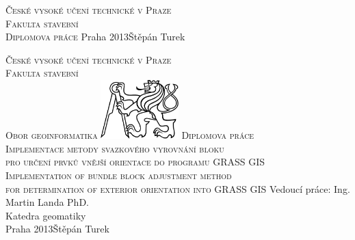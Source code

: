 \begin{center}



\newcommand{\napisCVUT}{České vysoké učení technické v Praze}
\newcommand{\napisFS}{Fakulta stavební}
\newcommand{\napisObor}{Obor geoinformatika}
\newcommand{\napisKatedra}{Katedra geomatiky}
\newcommand{\napisVedouci}{Ing. Martin Landa PhD.}
\newcommand{\napisAutor}{Štěpán Turek}
\newcommand{\napisDatum}{Praha 2013}
\newcommand{\napisNazevI}{Implementace metody svazkového vyrovnání bloku}
\newcommand{\napisNazevII}{pro určení prvků vnější orientace do programu GRASS GIS}
\newcommand{\napisNazevAjI}{Implementation of bundle block adjustment method}
\newcommand{\napisNazevAjII}{for determination of exterior orientation into GRASS GIS}
\newcommand{\napisBakalarka}{Diplomova práce}
\newcommand{\napisPraha}{Praha 2013}


%
\newcommand{\velka}[1]{\textsc{#1}}
%
% 
\newif\ifpatitul
\patitultrue

\ifpatitul
{\Large\velka{\napisCVUT}}\\
\velka{\Large\napisFS}\\
\vfill
{\LARGE\velka{\napisBakalarka}}
\vfill
{\large\napisPraha\hfill\napisAutor}
\newpage
\fi%


{\Large\velka{\napisCVUT}}\\
{\Large\velka{\napisFS}}\\
{\Large\velka{\napisObor}}
\vfill
\includegraphics[width=3cm]{logo_cvut_cb} %
\vfill
{\Large\velka{\napisBakalarka}}\\
{\Large\velka{\napisNazevI\\
\napisNazevII}}\\
{\large\velka{\napisNazevAjI\\
\napisNazevAjII}}
\vfill
{\large%
Vedoucí práce: \napisVedouci\\
\napisKatedra\\
\bigskip
\napisDatum\hfill\napisAutor}
\end{center}

